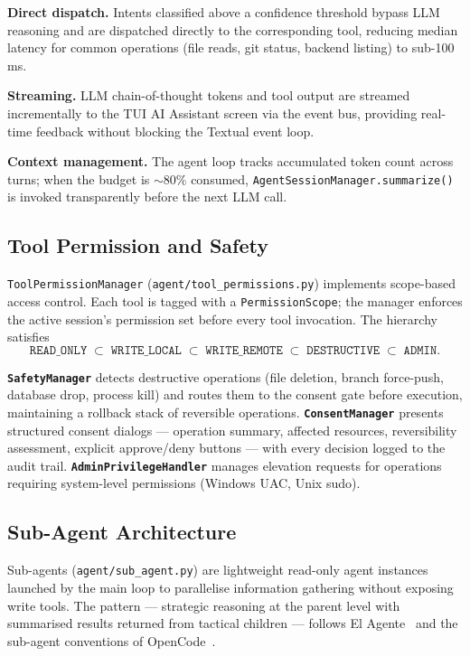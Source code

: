 \documentclass[11pt,a4paper]{article}
\begin{document}
\textbf{Direct dispatch.} Intents classified above a confidence threshold bypass
LLM reasoning and are dispatched directly to the corresponding tool, reducing
median latency for common operations (file reads, git status, backend listing)
to sub-100\,ms.

\textbf{Streaming.} LLM chain-of-thought tokens and tool output are streamed
incrementally to the TUI AI Assistant screen via the event bus, providing
real-time feedback without blocking the Textual event loop.

\textbf{Context management.} The agent loop tracks accumulated token count
across turns; when the budget is $\sim 80\%$ consumed,
\texttt{AgentSessionManager.summarize()} is invoked transparently before the
next LLM call.

\subsection{Tool Permission and Safety}

\texttt{ToolPermissionManager} (\texttt{agent/tool\_permissions.py}) implements
scope-based access control. Each tool is tagged with a \texttt{PermissionScope};
the manager enforces the active session's permission set before every tool
invocation. The hierarchy satisfies
\[
  \texttt{READ\_ONLY}\;\subset\;\texttt{WRITE\_LOCAL}\;\subset\;
  \texttt{WRITE\_REMOTE}\;\subset\;\texttt{DESTRUCTIVE}\;\subset\;\texttt{ADMIN}.
\]

\textbf{\texttt{SafetyManager}} detects destructive operations (file deletion,
branch force-push, database drop, process kill) and routes them to the consent
gate before execution, maintaining a rollback stack of reversible operations.
\textbf{\texttt{ConsentManager}} presents structured consent dialogs --- operation
summary, affected resources, reversibility assessment, explicit approve/deny
buttons --- with every decision logged to the audit trail.
\textbf{\texttt{AdminPrivilegeHandler}} manages elevation requests for operations
requiring system-level permissions (Windows UAC, Unix sudo).

\subsection{Sub-Agent Architecture}
\label{sec:proxima-subagents}

Sub-agents (\texttt{agent/sub\_agent.py}) are lightweight read-only agent
instances launched by the main loop to parallelise information gathering without
exposing write tools. The pattern --- strategic reasoning at the parent level
with summarised results returned from tactical children --- follows El
Agente~\cite{zou2025elagente} and the sub-agent conventions of
OpenCode~\cite{opencode2025}.
\end{document}
